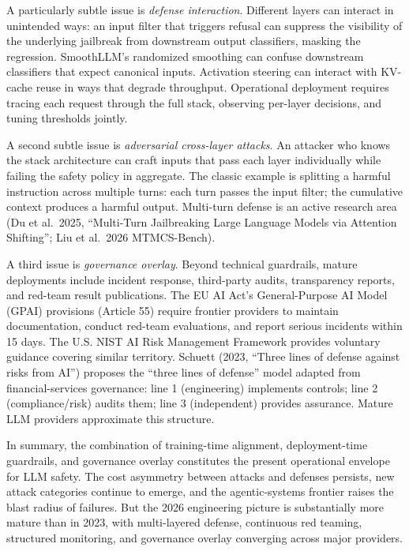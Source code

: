 \documentclass{article}
\begin{document}
A particularly subtle issue is \emph{defense interaction}. Different layers can interact in unintended ways: an input filter that triggers refusal can suppress the visibility of the underlying jailbreak from downstream output classifiers, masking the regression. SmoothLLM's randomized smoothing can confuse downstream classifiers that expect canonical inputs. Activation steering can interact with KV-cache reuse in ways that degrade throughput. Operational deployment requires tracing each request through the full stack, observing per-layer decisions, and tuning thresholds jointly.

A second subtle issue is \emph{adversarial cross-layer attacks}. An attacker who knows the stack architecture can craft inputs that pass each layer individually while failing the safety policy in aggregate. The classic example is splitting a harmful instruction across multiple turns: each turn passes the input filter; the cumulative context produces a harmful output. Multi-turn defense is an active research area (Du et al.~2025, ``Multi-Turn Jailbreaking Large Language Models via Attention Shifting''; Liu et al.~2026 MTMCS-Bench).

A third issue is \emph{governance overlay}. Beyond technical guardrails, mature deployments include incident response, third-party audits, transparency reports, and red-team result publications. The EU AI Act's General-Purpose AI Model (GPAI) provisions (Article 55) require frontier providers to maintain documentation, conduct red-team evaluations, and report serious incidents within 15 days. The U.S. NIST AI Risk Management Framework provides voluntary guidance covering similar territory. Schuett (2023, ``Three lines of defense against risks from AI'') proposes the ``three lines of defense'' model adapted from financial-services governance: line 1 (engineering) implements controls; line 2 (compliance/risk) audits them; line 3 (independent) provides assurance. Mature LLM providers approximate this structure.

In summary, the combination of training-time alignment, deployment-time guardrails, and governance overlay constitutes the present operational envelope for LLM safety. The cost asymmetry between attacks and defenses persists, new attack categories continue to emerge, and the agentic-systems frontier raises the blast radius of failures. But the 2026 engineering picture is substantially more mature than in 2023, with multi-layered defense, continuous red teaming, structured monitoring, and governance overlay converging across major providers.
\end{document}
